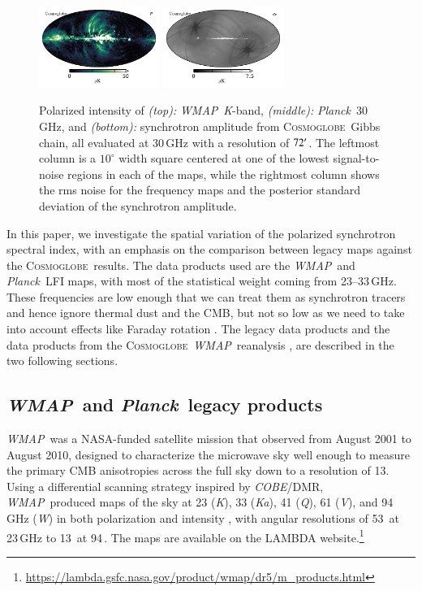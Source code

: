 \documentclass[twocolumn]{../../common/aa}
\def\WMAP{\emph{WMAP}}
\def\COBE{\emph{COBE}}
\def\Planck{\emph{Planck}}
\newcommand{\cosmoglobe}{\textsc{Cosmoglobe}}
\newcommand{\K}[0]{\textit K}
\newcommand{\Ka}[0]{\textit{Ka}}
\newcommand{\Q}[0]{\textit Q}
\newcommand{\V}[0]{\textit V}
\newcommand{\W}[0]{\textit W}
\begin{document}
\begin{figure}
	\includegraphics[width=0.35\textwidth]{figures/polint_CG.pdf}
	\includegraphics[width=0.35\textwidth]{figures/polint_CG_sigma.pdf}
	\caption{
		Polarized intensity of \textit{(top):} \WMAP\ \K-band, \textit{(middle):} \Planck\ 30\,GHz, and \textit{(bottom):} synchrotron amplitude from \cosmoglobe\ Gibbs chain, all evaluated at 30\,GHz with a resolution of $72\arcm$. The leftmost column is a $10^\circ$ width square centered at one of the lowest signal-to-noise regions in each of the maps, while the rightmost column shows the rms noise for the frequency maps and the posterior standard deviation of the synchrotron amplitude.
		}
       \label{fig:synch_polint}
\end{figure}

In this paper, we investigate the spatial variation of the polarized synchrotron spectral index, with an emphasis on the comparison between  legacy maps against the \cosmoglobe\ results. The data products used are the \WMAP\ and \Planck\ LFI maps, with most of the statistical weight coming from 23--33\,GHz. These frequencies are low enough that we can treat them as synchrotron tracers and hence ignore thermal dust and the CMB, but not so low as we need to take into account effects like Faraday rotation \citep{fuskeland:2019}. The legacy data products and the data products from the \cosmoglobe\ \WMAP\ reanalysis \citep{watts2023_dr1}, are described in the two following sections.


\subsection{\WMAP\ and \Planck\ legacy products}
\label{sec:wmap_data}

\WMAP\ was a NASA-funded satellite mission that observed from August 2001 to August 2010, designed to characterize the microwave sky well enough to measure the primary CMB anisotropies across the full sky down to a resolution of 13\arcm. Using a differential scanning strategy inspired by \COBE/DMR,
\WMAP\ produced maps of the sky at 23 (\K), 33 (\Ka), 41 (\Q), 61 (\V), and 94\,GHz (\W) in both polarization and intensity \citep{bennett2012}, with angular resolutions of 53\arcm\ at 23\,GHz to 13\arcm\ at 94\,\GHz. 
The maps are available on the LAMBDA website.\footnote{\url{https://lambda.gsfc.nasa.gov/product/wmap/dr5/m_products.html}} 
\end{document}
